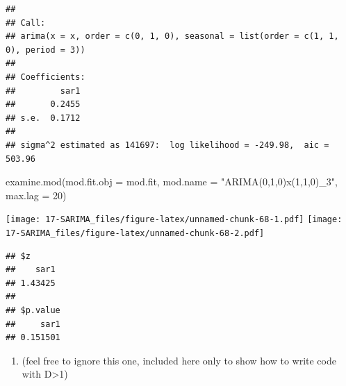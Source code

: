 \documentclass[
]{book}
\newenvironment{Shaded}{\begin{snugshade}}{\end{snugshade}}
\newcommand{\AttributeTok}[1]{\textcolor[rgb]{0.77,0.63,0.00}{#1}}
\newcommand{\DecValTok}[1]{\textcolor[rgb]{0.00,0.00,0.81}{#1}}
\newcommand{\FunctionTok}[1]{\textcolor[rgb]{0.00,0.00,0.00}{#1}}
\newcommand{\NormalTok}[1]{#1}
\newcommand{\StringTok}[1]{\textcolor[rgb]{0.31,0.60,0.02}{#1}}
\providecommand{\tightlist}{%
  \setlength{\itemsep}{0pt}\setlength{\parskip}{0pt}}
\theoremstyle{definition}
\theoremstyle{definition}
\theoremstyle{definition}
\theoremstyle{definition}
\theoremstyle{remark}
\begin{document}
\begin{verbatim}
## 
## Call:
## arima(x = x, order = c(0, 1, 0), seasonal = list(order = c(1, 1, 0), period = 3))
## 
## Coefficients:
##         sar1
##       0.2455
## s.e.  0.1712
## 
## sigma^2 estimated as 141697:  log likelihood = -249.98,  aic = 503.96
\end{verbatim}

\begin{Shaded}
\begin{Highlighting}[]
  \FunctionTok{examine.mod}\NormalTok{(}\AttributeTok{mod.fit.obj =}\NormalTok{ mod.fit, }\AttributeTok{mod.name =} \StringTok{"ARIMA(0,1,0)x(1,1,0)\_3"}\NormalTok{, }\AttributeTok{max.lag =} \DecValTok{20}\NormalTok{)}
\end{Highlighting}
\end{Shaded}

\texttt{[image: 17-SARIMA\_files/figure-latex/unnamed-chunk-68-1.pdf]} \texttt{[image: 17-SARIMA\_files/figure-latex/unnamed-chunk-68-2.pdf]}

\begin{verbatim}
## $z
##    sar1 
## 1.43425 
## 
## $p.value
##     sar1 
## 0.151501
\end{verbatim}

\begin{enumerate}
\def\labelenumi{\arabic{enumi}.}
\setcounter{enumi}{4}
\tightlist
\item
  (feel free to ignore this one, included here only to show how to write code with D\textgreater1)
\end{enumerate}
\end{document}
